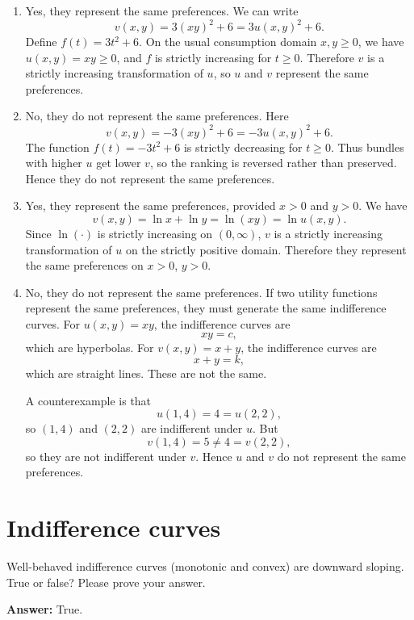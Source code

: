 \documentclass[12pt,a4paper]{article}
\begin{document}
\begin{enumerate}[label=(\alph*)]
  \item Yes, they represent the same preferences. We can write
  \[
    v(x,y)=3(xy)^2+6=3u(x,y)^2+6.
  \]
  Define $f(t)=3t^2+6$. On the usual consumption domain $x,y\ge 0$, we have $u(x,y)=xy\ge 0$, and $f$ is strictly increasing for $t\ge 0$. Therefore $v$ is a strictly increasing transformation of $u$, so $u$ and $v$ represent the same preferences.

  \item No, they do not represent the same preferences. Here
  \[
    v(x,y)=-3(xy)^2+6=-3u(x,y)^2+6.
  \]
  The function $f(t)=-3t^2+6$ is strictly decreasing for $t\ge 0$. Thus bundles with higher $u$ get lower $v$, so the ranking is reversed rather than preserved. Hence they do not represent the same preferences.

  \item Yes, they represent the same preferences, provided $x>0$ and $y>0$. We have
  \[
    v(x,y)=\ln x+\ln y=\ln(xy)=\ln u(x,y).
  \]
  Since $\ln(\cdot)$ is strictly increasing on $(0,\infty)$, $v$ is a strictly increasing transformation of $u$ on the strictly positive domain. Therefore they represent the same preferences on $x>0$, $y>0$.

  \item No, they do not represent the same preferences. If two utility functions represent the same preferences, they must generate the same indifference curves. For $u(x,y)=xy$, the indifference curves are
  \[
    xy=c,
  \]
  which are hyperbolas. For $v(x,y)=x+y$, the indifference curves are
  \[
    x+y=k,
  \]
  which are straight lines. These are not the same.

  A counterexample is that
  \[
    u(1,4)=4=u(2,2),
  \]
  so $(1,4)$ and $(2,2)$ are indifferent under $u$. But
  \[
    v(1,4)=5 \neq 4=v(2,2),
  \]
  so they are not indifferent under $v$. Hence $u$ and $v$ do not represent the same preferences.
\end{enumerate}

\section{Indifference curves}
Well-behaved indifference curves (monotonic and convex) are downward sloping. True or false? Please prove your answer.

\vspace{0.5cm}

\noindent\textbf{Answer:} True. 
\end{document}
